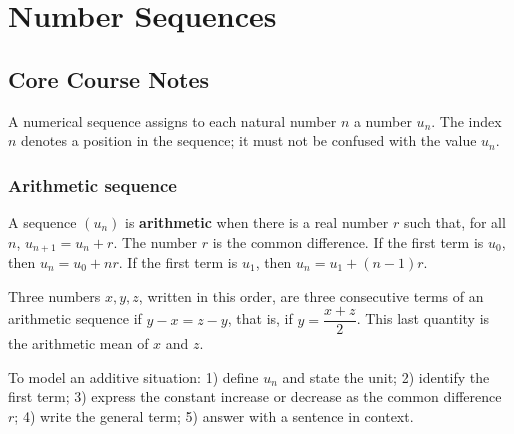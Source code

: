 
\chapter{Number Sequences}

\section{Core Course Notes}
A numerical sequence assigns to each natural number $n$ a number $u_n$. The index $n$ denotes a position in the sequence; it must not be confused with the value $u_n$.

\subsection{Arithmetic sequence}
\begin{retenir}
A sequence $(u_n)$ is \textbf{arithmetic} when there is a real number $r$ such that, for all $n$, $u_{n+1}=u_n+r$. The number $r$ is the common difference. If the first term is $u_0$, then $u_n=u_0+nr$. If the first term is $u_1$, then $u_n=u_1+(n-1)r$.
\end{retenir}

\begin{center}
\end{center}

Three numbers $x,y,z$, written in this order, are three consecutive terms of an arithmetic sequence if $y-x=z-y$, that is, if $y=\dfrac{x+z}{2}$. This last quantity is the arithmetic mean of $x$ and $z$.

\begin{methode}
To model an additive situation: 1) define $u_n$ and state the unit; 2) identify the first term; 3) express the constant increase or decrease as the common difference $r$; 4) write the general term; 5) answer with a sentence in context.
\end{methode}

